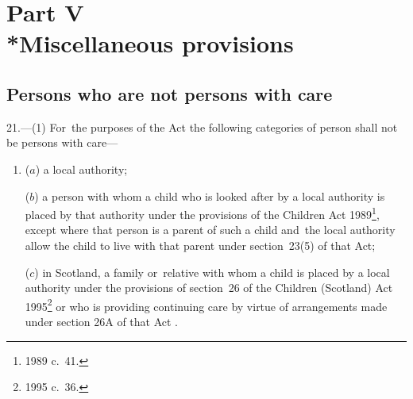 \documentclass[12pt,a4paper]{article}
\begin{document}
%
%
%
%
%
%

\section[Part V --- Miscellaneous provisions]{Part V\\*Miscellaneous provisions}

\renewcommand\parthead{--- Part V}

\subsection[21. Persons who are not persons with care]{Persons who are not persons with care}

21.---(1)  For~the purposes of the Act the following categories of person shall not be persons with care—
\begin{enumerate}\item[]
($a$) a local authority;

($b$) a person with whom a child who is looked after by a local authority is placed by that authority under the provisions of the Children Act 1989\footnote{1989 c.\ 41.}, except where that person is a parent of such a child and~the local authority allow the child to live with that parent under section~23(5) of that Act;

($c$) in Scotland, a family or~relative with whom a child is placed by a local authority under the provisions of section~26 of the Children (Scotland) Act 1995\footnote{1995 c.\ 36.}
or who is providing continuing care by virtue of arrangements made under section 26A of that Act%
.
\end{enumerate}
\end{document}
